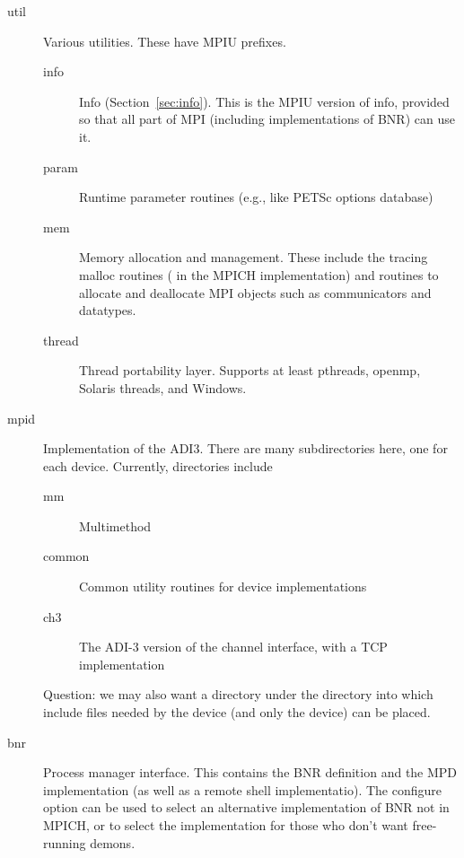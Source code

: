 \documentclass{article}
\begin{document}
\begin{description}
\begin{description}
  \item[util]Various utilities.  These have MPIU prefixes.
    \begin{description}
    \item[info]Info (Section~\ref{sec:info}).  This is the MPIU
    version of info, provided so 
    that all part of MPI (including implementations of BNR) can use it.
    \item[param]Runtime parameter routines (e.g., like PETSc options database)
    \item[mem]Memory allocation and management.  These include the tracing
      malloc routines ( in the MPICH implementation) and
    routines to allocate and deallocate MPI objects such as
    communicators and datatypes.
    \item[thread]Thread portability layer.  Supports at least pthreads,
      openmp, Solaris threads, and Windows.
    \end{description}
  \item[mpid]Implementation of the ADI3.  There are many
    subdirectories here, one for each device.  Currently, directories include
    \begin{description}
    \item[mm]Multimethod
    \item[common]Common utility routines for device implementations
    \item[ch3]The ADI-3 version of the channel interface, with a TCP
    implementation
    \end{description}
    Question: we may also want a  directory under the
     directory into which include files needed by the
    device (and only the device) can be placed.
  \item[bnr]Process manager interface.  This contains the BNR
      definition and the MPD implementation (as well as a remote shell
      implementatio).  The configure option
       can be used to select an alternative
      implementation of BNR not in MPICH, or to select the
       implementation for those who don't want
      free-running demons.


\end{description}
\end{description}
\end{document}
